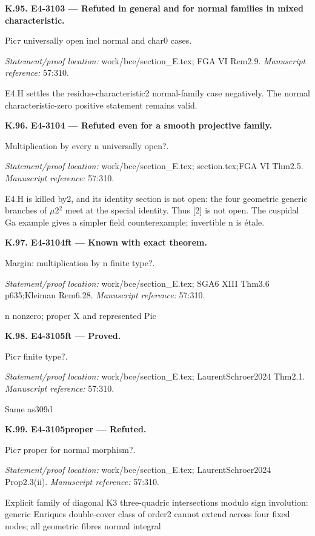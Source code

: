 \par\medskip\noindent\textbf{K.95. E4-3103 --- Refuted in general and for normal families in mixed characteristic.}\par
Pic\ensuremath{\tau} universally open incl normal and char0 cases.
\par\emph{Statement/proof location:} work/bce/section\_E.tex; FGA VI Rem2.9.
\emph{Manuscript reference:} 57:310.
\par E4.H settles the residue-characteristic2 normal-family case negatively. The normal characteristic-zero positive statement remains valid.
\par\medskip\noindent\textbf{K.96. E4-3104 --- Refuted even for a smooth projective family.}\par
Multiplication by every n universally open?.
\par\emph{Statement/proof location:} work/bce/section\_E.tex; section.tex;FGA VI Thm2.5.
\emph{Manuscript reference:} 57:310.
\par E4.H is killed by2, and its identity section is not open: the four geometric generic branches of \ensuremath{\mu}2\ensuremath{{}^2} meet at the special identity. Thus [2] is not open. The cuspidal Ga example gives a simpler field counterexample; invertible n is étale.
\par\medskip\noindent\textbf{K.97. E4-3104ft --- Known with exact theorem.}\par
Margin: multiplication by n finite type?.
\par\emph{Statement/proof location:} work/bce/section\_E.tex; SGA6 XIII Thm3.6 p635;Kleiman Rem6.28.
\emph{Manuscript reference:} 57:310.
\par n nonzero; proper X and represented Pic
\par\medskip\noindent\textbf{K.98. E4-3105ft --- Proved.}\par
Pic\ensuremath{\tau} finite type?.
\par\emph{Statement/proof location:} work/bce/section\_E.tex; LaurentSchroer2024 Thm2.1.
\emph{Manuscript reference:} 57:310.
\par Same as309d
\par\medskip\noindent\textbf{K.99. E4-3105proper --- Refuted.}\par
Pic\ensuremath{\tau} proper for normal morphism?.
\par\emph{Statement/proof location:} work/bce/section\_E.tex; LaurentSchroer2024 Prop2.3(ii).
\emph{Manuscript reference:} 57:310.
\par Explicit family of diagonal K3 three-quadric intersections modulo sign involution: generic Enriques double-cover class of order2 cannot extend across four fixed nodes; all geometric fibres normal integral
